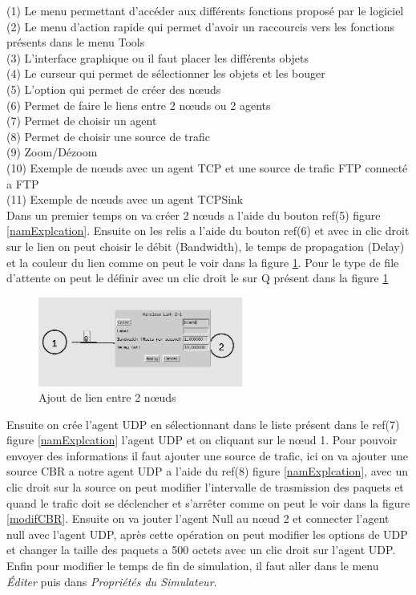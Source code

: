 \documentclass[11pt]{article}
\begin{document}
\noindent
(1) Le menu permettant d’accéder aux différents fonctions proposé par le logiciel\\
(2) Le menu d'action rapide qui permet d'avoir un raccourcis vers les fonctions présents dans le menu Tools\\
(3) L'interface graphique ou il faut placer les différents objets \\
(4) Le  curseur qui permet de sélectionner les objets et les bouger\\
(5) L'option qui permet de créer des nœuds\\
(6) Permet de faire le liens entre 2 nœuds ou 2 agents\\
(7) Permet de choisir un agent\\
(8) Permet de choisir une source de trafic \\
(9) Zoom/Dézoom\\
(10) Exemple de nœuds avec un agent TCP et une source de trafic FTP connecté a FTP\\
(11) Exemple de nœuds avec un agent TCPSink\\

Dans un premier temps on va créer 2 nœuds a l'aide du bouton ref(5) figure \ref{namExplcation}. Ensuite on les relis a l'aide du bouton ref(6) et avec in clic droit sur le lien on peut choisir le débit (Bandwidth), le temps de propagation (Delay) et la couleur du lien comme on peut le voir dans la figure \ref{ajoutLien}. Pour le type de file d'attente on peut le définir avec un clic droit le sur Q présent dans la figure \ref{ajoutLien}

\begin{figure}[H]
	\begin{center}
		\includegraphics[width=0.6\textwidth]{assets/tp1/ajoutLienNoeud.png}
	\end{center}
	\caption{Ajout de lien entre 2 nœuds}
	\label{ajoutLien}
\end{figure}

Ensuite on crée l'agent UDP en sélectionnant dans le liste présent dans le ref(7) figure \ref{namExplcation} l'agent UDP et on cliquant sur le nœud 1. Pour pouvoir envoyer des informations il faut ajouter une source de trafic, ici on va ajouter une source CBR a notre agent UDP a l'aide du ref(8) figure \ref{namExplcation}, avec un clic droit sur la source on peut modifier l'intervalle de trasmission des paquets et quand le trafic doit se déclencher et s’arrêter comme on peut le voir dans la figure \ref{modifCBR}. Ensuite on va jouter l'agent Null au nœud 2 et connecter l'agent null avec l'agent UDP, après cette opération on peut modifier les options de UDP et changer la taille des paquets a 500 octets avec un clic droit sur l'agent UDP. Enfin pour modifier le temps de fin de simulation, il faut aller dans le menu \textit{Éditer} puis dans \textit{Propriétés du Simulateur}.
\end{document}
